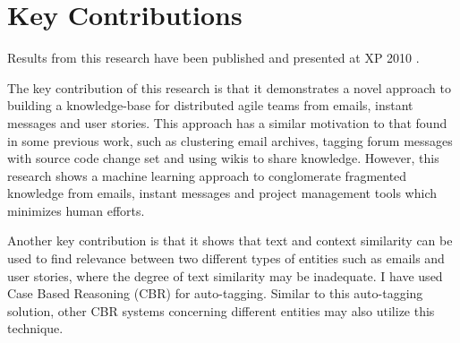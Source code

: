 \section{Key Contributions}
Results from this research have been published and presented at XP 2010 \cite{auto_tagging}. 

The key contribution of this research is that it demonstrates a novel approach to building a knowledge-base for distributed agile teams from emails, instant messages and user stories. This approach has a similar motivation to that found in some previous work, such as clustering email archives\cite{using_hybrid}, tagging forum messages with source code change set\cite{hipikat, hipikat_2} and using wikis to share knowledge. However, this research shows a machine learning approach to conglomerate fragmented knowledge from emails, instant messages and project management tools which minimizes human efforts.
                                  
Another key contribution is that it shows that text and context similarity can be used to find relevance between two different types of entities such as emails and user stories, where the degree of text similarity may be inadequate. I have used Case Based Reasoning (CBR) for auto-tagging. Similar to this auto-tagging solution, other CBR systems concerning different entities may also utilize this technique.
